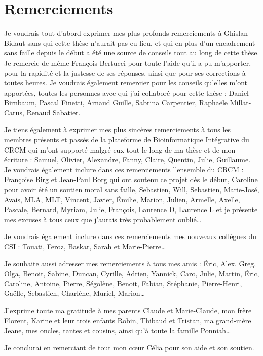 \chapter*{Remerciements}

\noindent{}Je voudrais tout d'abord exprimer mes plus profonds remerciements à Ghislan Bidaut sans qui cette thèse n'aurait pas eu lieu, et qui en plus d'un encadrement sans faille depuis le début a été une source de conseils tout au long de cette thèse. Je remercie de même François Bertucci pour toute l'aide qu'il a pu m'apporter, pour la rapidité et la justesse de ses réponses, ainsi que pour ses corrections à toutes heures. Je voudrais également remercier pour les conseils qu'elles m'ont apportées, toutes les personnes avec qui j'ai collaboré pour cette thèse : Daniel Birnbaum, Pascal Finetti, Arnaud Guille, Sabrina Carpentier, Raphaële Millat-Carus, Renaud Sabatier.
\vspace{.5cm}

\noindent{}Je tiens également à exprimer mes plus sincères remerciements à tous les membres présents et passés de la plateforme de Bioinformatique Intégrative du CRCM qui m'ont supporté malgré eux tout le long de ma thèse et de mon écriture : Samuel, Olivier, Alexandre, Fanny, Claire, Quentin, Julie, Guillaume. Je voudrais également inclure dans ces remerciements l'ensemble du CRCM : Françoise Birg et Jean-Paul Borg qui ont soutenu ce projet dès le début, Caroline pour avoir été un soutien moral sans faille, Sebastien, Will, Sebastien, Marie-José, Avais, MLA, MLT, Vincent, Javier, Émilie, Marion, Julien, Armelle, Axelle, Pascale, Bernard, Myriam, Julie, François, Laurence D, Laurence L et je présente mes excuses à tous ceux que j'aurais très probablement oublié\dots
\vspace{.5cm}

\noindent{}Je voudrais également inclure dans ces remerciements mes nouveaux collègues du \acs{CSI} : Touati, Feroz, Baskar, Sarah et Marie-Pierre\dots
\vspace{.5cm}

\noindent{}Je souhaite aussi adresser mes remerciements à tous mes amis : Éric, Alex, Greg, Olga, Benoit, Sabine, Duncan, Cyrille, Adrien, Yannick, Caro, Julie, Martin, Éric, Caroline, Antoine, Pierre, Ségolène, Benoit, Fabian, Stéphanie, Pierre-Henri, Gaëlle, Sebastien, Charlène, Muriel, Marion\dots
\vspace{.5cm}

\noindent{}J'exprime toute ma gratitude à mes parents Claude et Marie-Claude, mon frère Florent, Karine et leur trois enfants Robin, Thibaud et Tristan, ma grand-mère Jeane, mes oncles, tantes et cousins, ainsi qu'à toute la famille Ponniah\dots
\vspace{.5cm}

\noindent{}Je conclurai en remerciant de tout mon c{\oe}ur Célia pour son aide et son soutien.